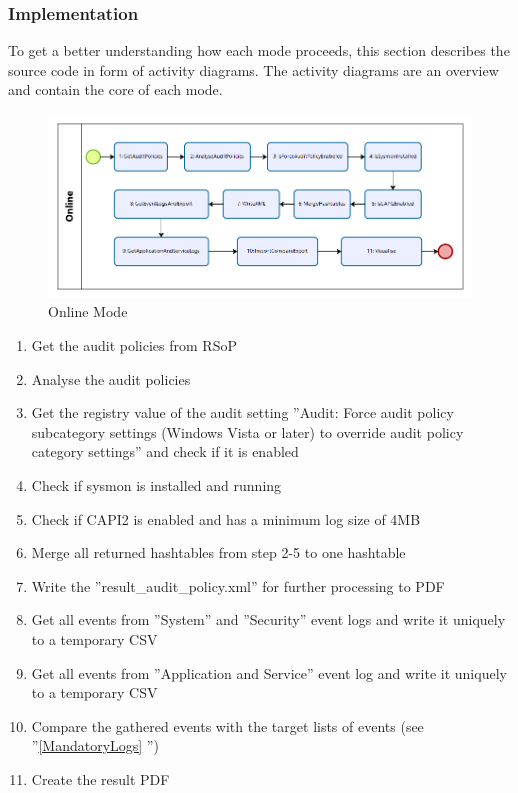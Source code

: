 \subsubsection{Implementation}
To get a better understanding how each mode proceeds, this section describes the source code in form of activity diagrams. The activity diagrams are an overview and contain the core of each mode.
\begin{figure}[H]
    \centering
    \includegraphics[width=1\linewidth]{assets/modes/online.png}
    \caption{Online Mode}
\end{figure}
\begin{enumerate}
    \item Get the audit policies from RSoP
    \item Analyse the audit policies
    \item Get the registry value of the audit setting ''Audit: Force audit policy subcategory settings (Windows Vista or later) to override audit policy category settings'' and check if it is enabled
    \item Check if sysmon is installed and running
    \item Check if CAPI2 is enabled and has a minimum log size of 4MB
    \item Merge all returned hashtables from step 2-5 to one hashtable
    \item Write the ''result\_audit\_policy.xml'' for further processing to PDF
    \item Get all events from ''System'' and ''Security'' event logs and write it uniquely to a temporary CSV
    \item Get all events from ''Application and Service'' event log and write it uniquely to a temporary CSV
    \item Compare the gathered events with the target lists of events (see ''\ref{MandatoryLogs} '')
    \item Create the result PDF
\end{enumerate}

